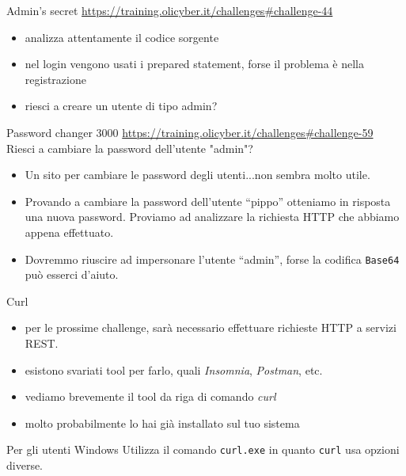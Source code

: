 \documentclass[12pt,handout]{beamer}
\begin{document}
\begin{frame}{Admin's secret}
\url{https://training.olicyber.it/challenges\#challenge-44}
\vfill
\begin{itemize}
    \item analizza attentamente il codice sorgente
    \pause
    \item nel login vengono usati i prepared statement, forse il problema è nella registrazione
    \pause
    \item riesci a creare un utente di tipo admin?
\end{itemize}

\end{frame}

\begin{frame}{Password changer 3000}
    \url{https://training.olicyber.it/challenges\#challenge-59}
    \vfill
    Riesci a cambiare la password dell'utente "admin"?
    \begin{itemize}
        \item Un sito per cambiare le password degli utenti...non sembra molto utile.
        \pause
        \item Provando a cambiare la password dell'utente ``pippo'' otteniamo in risposta una nuova password. Proviamo ad analizzare la richiesta HTTP che abbiamo appena effettuato. 
        \pause
        \item Dovremmo riuscire ad impersonare l'utente ``admin'', forse la codifica \texttt{Base64} può esserci d'aiuto.
        \pause
    \end{itemize}
\end{frame}

\begin{frame}{Curl}
\begin{itemize}
    \item per le prossime challenge, sarà necessario effettuare richieste HTTP a servizi REST. 
    \item esistono svariati tool per farlo, quali \textit{Insomnia}, \textit{Postman}, etc.
    \item vediamo brevemente il tool da riga di comando \textit{curl}
    \item molto probabilmente lo hai già installato sul tuo sistema
\end{itemize}
\vfill
\begin{alertblock}{Per gli utenti Windows}
Utilizza il comando \texttt{curl.exe} in quanto \texttt{curl} usa opzioni diverse.
\end{alertblock}
\end{frame}
\end{document}
